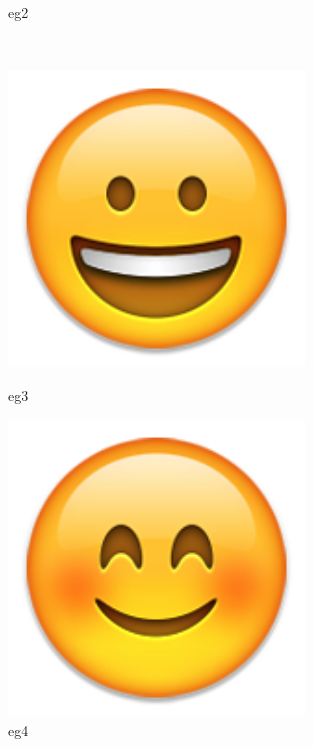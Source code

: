 \begin{solution}
\begin{enumerate}[nosep,label=(\arabic*)]
\begin{itemize}
\begin{latexamplev}[]
\begin{figure}[H]
\begin{minipage}[b]{0.3\textwidth}
    \caption{eg2}
  \end{minipage} \\
  \begin{minipage}[b]{0.3\textwidth}
    \centering
    \includegraphics[width=0.7\textwidth]{./pic/03.png}
    \caption{eg3}
  \end{minipage}
  \hspace{-0.03\textwidth}
  \begin{minipage}[b]{0.3\textwidth}
    \centering
    \includegraphics[width=0.7\textwidth]{./pic/04.png}
    \caption{eg4}
  \end{minipage}
  \hspace{-0.03\textwidth}
  \begin{minipage}[b]{0.3\textwidth}
    \centering

\end{minipage}
\end{figure}
\end{latexamplev}
\end{itemize}
\end{enumerate}
\end{solution}
